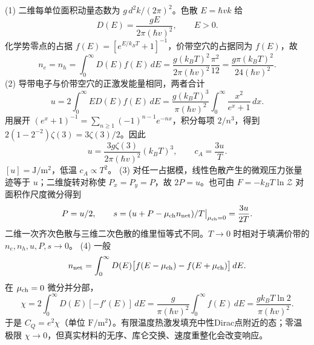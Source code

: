 (1) 二维每单位面积动量态数为 \(g\,d^2k/(2\pi)^2\)。色散 \(E=\hbar v k\) 给
\[
D(E)=\frac{gE}{2\pi(\hbar v)^2},\qquad E>0.
\]
化学势零点的占据 \(f(E)=[e^{E/k_BT}+1]^{-1}\)，价带空穴的占据同为 \(f(E)\)，故
\[
n_e=n_h=\int_0^\infty D(E)f(E)\,dE
=\frac{g(k_BT)^2}{2\pi(\hbar v)^2}\frac{\pi^2}{12}
=\frac{g\pi(k_BT)^2}{24(\hbar v)^2}.
\]
(2) 导带电子与价带空穴的正激发能量相同，两者合计
\[
u=2\int_0^\infty ED(E)f(E)\,dE
=\frac{g(k_BT)^3}{\pi(\hbar v)^2}\int_0^\infty\frac{x^2}{e^x+1}\,dx.
\]
用展开 \((e^x+1)^{-1}=\sum_{n\ge1}(-1)^{n-1}e^{-nx}\)，积分每项 \(2/n^3\)，得到 \(2(1-2^{-2})\zeta(3)=3\zeta(3)/2\)。因此
\[
u=\frac{3g\zeta(3)}{2\pi(\hbar v)^2}(k_BT)^3,\qquad c_A=\frac{3u}{T}.
\]
\([u]=\mathrm{J/m^2}\)，低温 \(c_A\propto T^2\)。
(3) 对任一占据模，线性色散产生的微观压力张量迹等于 \(u\)；二维旋转对称使 \(P_x=P_y=P\)，故 \(2P=u\)。也可由 \(F=-k_BT\ln\mathcal Z\) 对面积作尺度微分得到
\[
P=u/2,\qquad s=(u+P-\mu_{\rm ch} n_{\rm net})/T\big|_{\mu_{\rm ch}=0}
=\frac{3u}{2T}.
\]
二维一次齐次色散与三维二次色散的维里恒等式不同。\(T\to0\) 时相对于填满价带的 \(n_e,n_h,u,P,s\to0\)。
(4) 一般
\[
n_{\rm net}=\int_0^\infty D(E)\bigl[f(E-\mu_{\rm ch})-f(E+\mu_{\rm ch})\bigr]\,dE.
\]
在 \(\mu_{\rm ch}=0\) 微分并分部，
\[
\chi=2\int_0^\infty D(E)[-f'(E)]\,dE
=\frac{g}{\pi(\hbar v)^2}\int_0^\infty f(E)\,dE
=\frac{g k_BT\ln2}{\pi(\hbar v)^2}.
\]
于是 \(C_Q=e^2\chi\)（单位 \(\mathrm{F/m^2}\)）。有限温度热激发填充中性Dirac点附近的态；零温极限 \(\chi\to0\)，但真实材料的无序、库仑交换、速度重整化会改变响应。
